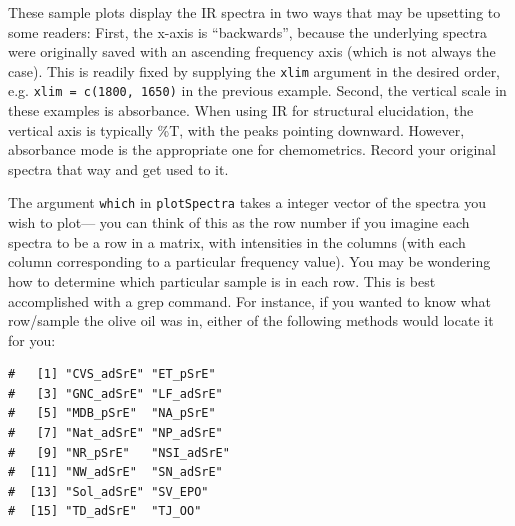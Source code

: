 \documentclass[letter,10pt,twocolumn,twoside,printwatermark=false]{pinp}
\begin{document}
These sample plots display the IR spectra in two ways that may be
upsetting to some readers: First, the x-axis is ``backwards'', because
the underlying spectra were originally saved with an ascending frequency
axis (which is not always the case). This is readily fixed by supplying
the \texttt{xlim} argument in the desired order, e.g.
\texttt{xlim = c(1800, 1650)} in the previous example. Second, the
vertical scale in these examples is absorbance. When using IR for
structural elucidation, the vertical axis is typically \%T, with the
peaks pointing downward. However, absorbance mode is the appropriate one
for chemometrics. Record your original spectra that way and get used to
it.

The argument \texttt{which} in \texttt{plotSpectra} takes a integer
vector of the spectra you wish to plot--- you can think of this as the
row number if you imagine each spectra to be a row in a matrix, with
intensities in the columns (with each column corresponding to a
particular frequency value). You may be wondering how to determine which
particular sample is in each row. This is best accomplished with a grep
command. For instance, if you wanted to know what row/sample the olive
oil was in, either of the following methods would locate it for you:

\begin{Shaded}
\begin{Highlighting}[]
\OperatorTok{$}
\end{Highlighting}
\end{Shaded}

\begin{ShadedResult}
\begin{verbatim}
#   [1] "CVS_adSrE" "ET_pSrE"  
#   [3] "GNC_adSrE" "LF_adSrE" 
#   [5] "MDB_pSrE"  "NA_pSrE"  
#   [7] "Nat_adSrE" "NP_adSrE" 
#   [9] "NR_pSrE"   "NSI_adSrE"
#  [11] "NW_adSrE"  "SN_adSrE" 
#  [13] "Sol_adSrE" "SV_EPO"   
#  [15] "TD_adSrE"  "TJ_OO"
\end{verbatim}
\end{ShadedResult}

\begin{Shaded}
\begin{Highlighting}[]
\NormalTok{(}\OperatorTok{$}
\end{Highlighting}
\end{Shaded}
\end{document}
